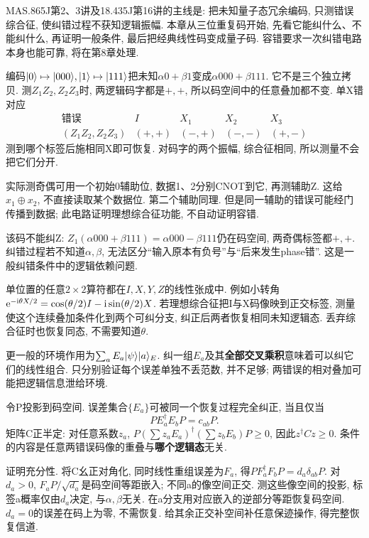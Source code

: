 MAS.865J第2、3讲及18.435J第16讲的主线是: 把未知量子态冗余编码, 只测错误综合征, 使纠错过程不获知逻辑振幅. 本章从三位重复码开始, 先看它能纠什么、不能纠什么, 再证明一般条件, 最后把经典线性码变成量子码. 容错要求一次纠错电路本身也能可靠, 将在第8章处理.

编码$\lvert 0\rangle\mapsto\lvert 000\rangle,\lvert 1\rangle\mapsto\lvert 111\rangle$把未知$\alpha0+\beta1$变成$\alpha000+\beta111$. 它不是三个独立拷贝. 测$Z_1Z_2,Z_2Z_3$时, 两逻辑码字都是$+,+$, 所以码空间中的任意叠加都不变. 单X错对应
\[\begin{array}{c|cccc}
\text{错误}&I&X_1&X_2&X_3\\\hline
(Z_1Z_2,Z_2Z_3)&(+,+)&(-,+)&(-,-)&(+,-)
\end{array}\]
测到哪个标签后施相同X即可恢复. 对码字的两个振幅, 综合征相同, 所以测量不会把它们分开.

实际测奇偶可用一个初始0辅助位, 数据1、2分别CNOT到它, 再测辅助Z. 这给$x_1\oplus x_2$, 不直接读取某个数据位. 第二个辅助同理. 但是同一辅助的错误可能经门传播到数据; 此电路证明理想综合征功能, 不自动证明容错.

该码不能纠Z: $Z_1(\alpha000+\beta111)=\alpha000-\beta111$仍在码空间, 两奇偶标签都$+,+$. 纠错过程若不知道$\alpha,\beta$, 无法区分“输入原本有负号”与“后来发生phase错”. 这是一般纠错条件中的逻辑依赖问题.

单位置的任意$2\times2$算符都在$I,X,Y,Z$的线性张成中. 例如小转角$\mathrm e^{-\mathrm i\theta X/2}=\cos(\theta/2)I-\mathrm i\sin(\theta/2)X$. 若理想综合征把I与X码像映到正交标签, 测量使这个连续叠加条件化到两个可纠分支, 纠正后两者恢复相同未知逻辑态. 丢弃综合征时也恢复同态, 不需要知道$\theta$.

更一般的环境作用为$\sum_aE_a\lvert \psi\rangle\lvert a\rangle_E$. 纠一组$E_a$及其\textbf{全部交叉乘积}意味着可以纠它们的线性组合. 只分别验证每个误差单独不丢范数, 并不足够; 两错误的相对叠加可能把逻辑信息泄给环境.

令P投影到码空间. 误差集合$\{E_a\}$可被同一个恢复过程完全纠正, 当且仅当
\[PE_a^\dagger E_bP=c_{ab}P.\]
矩阵C正半定: 对任意系数$z_a$, $P(\sum z_aE_a)^\dagger(\sum z_bE_b)P\ge0$, 因此$z^\dagger Cz\ge0$. 条件的内容是任意两错误码像的重叠与\textbf{哪个逻辑态}无关.

证明充分性. 将C幺正对角化, 同时线性重组误差为$F_a$, 得$PF_a^\dagger F_bP=d_a\delta_{ab}P$. 对$d_a>0$, $F_aP/\sqrt{d_a}$是码空间等距嵌入; 不同a的像空间正交. 测这些像空间的投影, 标签a概率仅由$d_a$决定, 与$\alpha,\beta$无关. 在a分支用对应嵌入的逆部分等距恢复码空间. $d_a=0$的误差在码上为零, 不需恢复. 给其余正交补空间补任意保迹操作, 得完整恢复信道.

